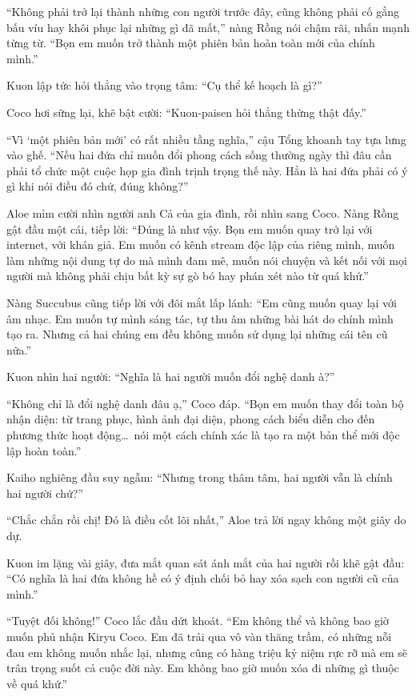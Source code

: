 ﻿\documentclass[../main.tex]{subfiles}
\begin{document}
``Không phải trở lại thành những con người trước đây, cũng không phải cố gắng bấu víu hay khôi phục lại những gì đã mất,'' nàng Rồng nói chậm rãi, nhấn mạnh từng từ. ``Bọn em muốn trở thành một phiên bản hoàn toàn mới của chính mình.''

Kuon lập tức hỏi thẳng vào trọng tâm: ``Cụ thể kế hoạch là gì?''

Coco hơi sững lại, khẽ bật cười: ``Kuon-paisen hỏi thẳng thừng thật đấy.''

``Vì `một phiên bản mới' có rất nhiều tầng nghĩa,'' cậu Tổng khoanh tay tựa lưng vào ghế. ``Nếu hai đứa chỉ muốn đổi phong cách sống thường ngày thì đâu cần phải tổ chức một cuộc họp gia đình trịnh trọng thế này. Hẳn là hai đứa phải có ý gì khi nói điều đó chứ, đúng không?''

Aloe mỉm cười nhìn người anh Cả của gia đình, rồi nhìn sang Coco. Nàng Rồng gật đầu một cái, tiếp lời: ``Đúng là như vậy. Bọn em muốn quay trở lại với internet, với khán giả. Em muốn có kênh stream độc lập của riêng mình, muốn làm những nội dung tự do mà mình đam mê, muốn nói chuyện và kết nối với mọi người mà không phải chịu bất kỳ sự gò bó hay phán xét nào từ quá khứ.''

Nàng Succubus cũng tiếp lời với đôi mắt lấp lánh: ``Em cũng muốn quay lại với âm nhạc. Em muốn tự mình sáng tác, tự thu âm những bài hát do chính mình tạo ra. Nhưng cả hai chúng em đều không muốn sử dụng lại những cái tên cũ nữa.''

Kuon nhìn hai người: ``Nghĩa là hai người muốn đổi nghệ danh à?''

``Không chỉ là đổi nghệ danh đâu ạ,'' Coco đáp. ``Bọn em muốn thay đổi toàn bộ nhận diện: từ trang phục, hình ảnh đại diện, phong cách biểu diễn cho đến phương thức hoạt động\dots\ nói một cách chính xác là tạo ra một bản thể mới độc lập hoàn toàn.''

Kaiho nghiêng đầu suy ngẫm: ``Nhưng trong thâm tâm, hai người vẫn là chính hai người chứ?''

``Chắc chắn rồi chị! Đó là điều cốt lõi nhất,'' Aloe trả lời ngay không một giây do dự.

Kuon im lặng vài giây, đưa mắt quan sát ánh mắt của hai người rồi khẽ gật đầu: ``Có nghĩa là hai đứa không hề có ý định chối bỏ hay xóa sạch con người cũ của mình.''

``Tuyệt đối không!'' Coco lắc đầu dứt khoát. ``Em không thể và không bao giờ muốn phủ nhận Kiryu Coco. Em đã trải qua vô vàn thăng trầm, có những nỗi đau em không muốn nhắc lại, nhưng cũng có hàng triệu kỷ niệm rực rỡ mà em sẽ trân trọng suốt cả cuộc đời này. Em không bao giờ muốn xóa đi những gì thuộc về quá khứ.''
\end{document}
